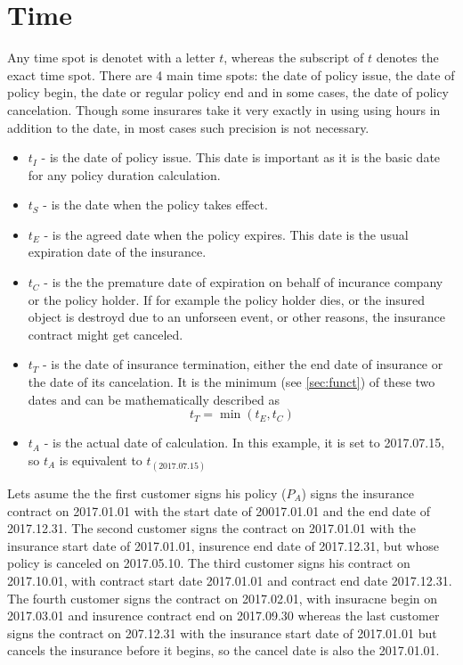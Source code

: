 \documentclass[11pt,a4paper,fleqn]{article}      %
\begin{document}
\section{Time}
Any time spot is denotet with a letter $t$, whereas the subscript of $t$ denotes the exact time spot. There are 4 main time spots: the date of policy issue, the date of policy begin, the date or regular policy end and in some cases, the date of policy cancelation. Though some insurares take it very exactly in using using hours in addition to the date, in most cases such precision is not necessary.
\begin{itemize}
\item $t_{I}$ - is the date of policy issue. This date is important as it is the basic date for any policy duration calculation. 
\item $t_{S}$ - is the date when the policy takes effect.
\item $t_{E}$ - is the agreed date when the policy expires. This date is the usual expiration date of the insurance.
\item $t_{C}$ - is the the premature date of expiration on behalf of incurance company or the policy holder. If for example the policy holder dies, or the insured object is destroyd due to an unforseen event, or other reasons, the insurance contract might get canceled.
\item $t_{T}$ - is the date of insurance termination, either the end date of insurance or the date of its cancelation. It is the minimum (see \ref{sec:funct}) of these two dates and can be mathematically described as $$t_T=\min(t_E, t_C)$$ 
\item $t_{A}$ - is the actual date of calculation. In this example, it is set to 2017.07.15, so $t_A$ is equivalent to $t_{(2017.07.15)}$
\end{itemize}



Lets asume the the first customer signs his policy ($P_A$) signs the insurance contract on 2017.01.01 with the start date of 20017.01.01 and the end date of 2017.12.31. The second customer signs the contract on 2017.01.01 with the insurance start date of 2017.01.01, insurence end date of 2017.12.31, but whose policy is canceled on 2017.05.10. The third customer signs his contract on 2017.10.01, with contract start date 2017.01.01 and contract end date 2017.12.31. The fourth customer signs the contract on 2017.02.01, with insuracne begin on 2017.03.01 and insurence contract end on 2017.09.30 whereas the last customer signs the contract on 207.12.31 with the insurance start date of 2017.01.01 but cancels the insurance before it begins, so the cancel date is also the 2017.01.01.
\end{document}

